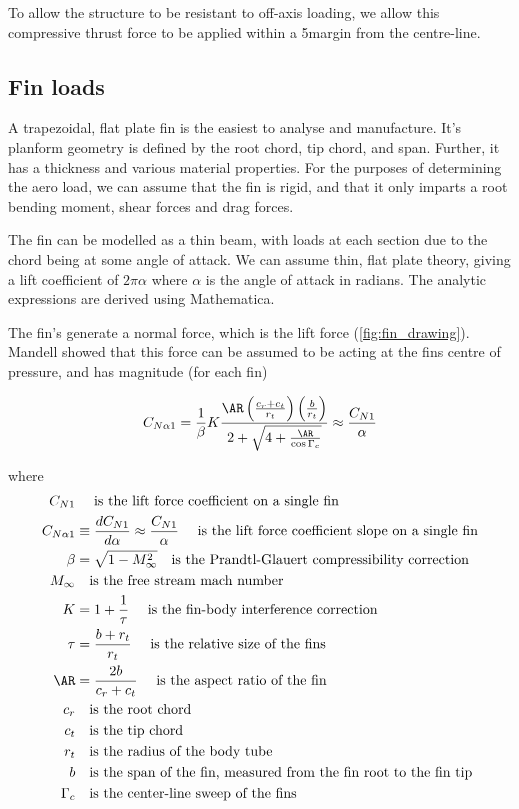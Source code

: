 \documentclass[11pt]{article}
\newcommand{\eqn}[1]{\begin{equation}#1\end{equation}}
\newcommand{\eqnalign}[1]{\begin{align*}#1\end{align*}}
\begin{document}
To allow the structure to be resistant to off-axis loading, we allow this compressive thrust force to be applied within a 5\degree margin from the centre-line. 

\subsection{Fin loads}

A trapezoidal, flat plate fin is the easiest to analyse and manufacture. It's planform geometry is defined by the root chord, tip chord, and span. Further, it has a thickness and various material properties. For the purposes of determining the aero load, we can assume that the fin is rigid, and that it only imparts a root bending moment, shear forces and drag forces. 

The fin can be modelled as a thin beam, with loads at each section due to the chord being at some angle of attack. We can assume thin, flat plate theory, giving a lift coefficient of $2\pi \alpha$ where $\alpha$ is the angle of attack in radians. The analytic expressions are derived using Mathematica. 

The fin's generate a normal force, which is the lift force (\autoref{fig:fin_drawing}). Mandell \cite{mandell1973topics} showed that this force can be assumed to be acting at the fins centre of pressure, and has magnitude (for each fin)

\eqn{
C_{N\alpha1} = \frac{1}{\beta} K \frac{\AR \left(\frac{c_r + c_t}{r_t}\right)\left( \frac{b}{r_t}\right) }{2 + \sqrt{4 + \frac{\AR}{\cos \Gamma_c}} } \approx \frac{C_{N1}}{\alpha}
}

where 
\eqnalign{
C_{N1} & \quad \text{ is the lift force coefficient on a single fin}\\
C_{N\alpha1} &\equiv \frac{dC_{N1}}{d\alpha} \approx \frac{C_{N1}}{\alpha}  \quad \text{ is the lift force coefficient slope on a single fin}\\
\beta &=\sqrt{1-M_\infty^2} \quad \text{is the Prandtl-Glauert compressibility correction}\\
M_\infty & \quad \text{is the free stream mach number}\\
K &= 1 + \frac{1}{\tau} \quad \text{ is the fin-body interference correction}\\
\tau &= \frac{b + r_t}{r_t} \quad \text{ is the relative size of the fins}\\
\AR&=\frac{2 b}{c_r + c_t} \quad \text{ is the aspect ratio of the fin}\\
c_r &\quad  \text{is the root chord}\\
c_t & \quad \text{is the tip chord}\\
r_t & \quad \text{is the radius of the body tube}\\
b & \quad \text{is the span of the fin, measured from the fin root to the fin tip}\\
\Gamma_c & \quad \text{is the center-line sweep of the fins}
}
\end{document}
